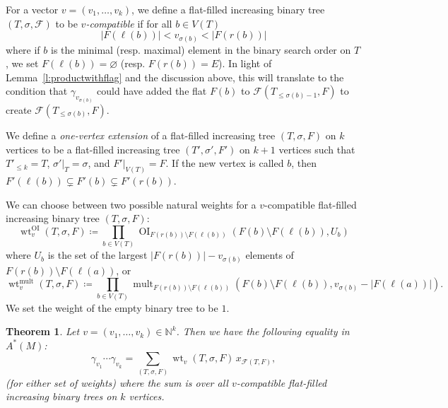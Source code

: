 \documentclass[10pt,a4paper]{amsart}
\numberwithin{equation}{section}
\numberwithin{figure}{section}
\newcommand{\N}{\mathbb{N}}
\newcommand{\cF}{\mathcal{F}}
\DeclareMathOperator{\OI}{OI}
\DeclareMathOperator{\mult}{mult}
\DeclareMathOperator{\wt}{wt}
\newtheorem{theorem}{Theorem}[section]
\theoremstyle{definition}
\theoremstyle{remark}
\begin{document}
For a vector $v = (v_1, \ldots, v_k)$, we define a flat-filled increasing binary tree $(T,\sigma,\cF)$ to be {\em $v$-compatible} if for all $b\in V(T)$
\[ |F(\ell(b))| < v_{\sigma(b)} < |F(r(b))|\]
where if $b$ is the minimal (resp. maximal) element in the binary search order on $T$, we set $F(\ell(b))=\varnothing$ (resp. $F(r(b))=E$).
In light of Lemma~\ref{l:productwithflag} and the discussion above, this will translate to the condition that $\gamma_{v_{\sigma(b)}}$ could have added the flat $F(b)$ to $\cF(T_{\leq \sigma(b)-1},F)$ to create $\cF(T_{\leq \sigma(b)},F)$.

We define a {\em one-vertex extension} of a flat-filled increasing tree $(T,\sigma,F)$ on $k$ vertices to be a flat-filled increasing tree $(T',\sigma',F')$ on $k+1$ vertices such that $T'_{\leq k} = T$, $\sigma'|_T = \sigma$, and $F'|_{V(T)} = F$.
If the new vertex is called $b$, then $F'(\ell(b))\subsetneq F'(b)\subsetneq F'(r(b))$.


We can choose between two possible natural weights for a $v$-compatible flat-filled increasing binary tree $(T,\sigma,F)$:
\[\wt^{\OI}_v(T,\sigma,F) \coloneqq \prod_{b\in V(T)} \OI_{F(r(b))\setminus F(\ell(b))} (F(b) \setminus F(\ell(b)), U_b)\]
where $U_b$ is the set of the largest $|F(r(b))| - v_{\sigma(b)}$ elements of $F(r(b)) \setminus F(\ell(a))$, or
\[\wt^{\mult}_v(T,\sigma,F) \coloneqq \prod_{b\in V(T)} \mult_{F(r(b))\setminus F(\ell(b))} (F(b) \setminus F(\ell(b)), v_{\sigma(b)}-|F(\ell(a))|).\]
We set the weight of the empty binary tree to be $1$.

\setcounter{theorem}{1}
\begin{theorem} \label{t:postnikov}
    Let $v = (v_1, \ldots, v_k) \in \N^k$. Then we have the following equality in $A^*(M)$:
    \[ \gamma_{v_1} \cdots \gamma_{v_k} = \sum_{(T,\sigma,F)} \wt_v(T,\sigma,F) \, x_{\cF(T,F)}, \]
    (for either set of weights) where the sum is over all $v$-compatible flat-filled increasing binary trees on $k$ vertices.
\end{theorem}
\end{document}
